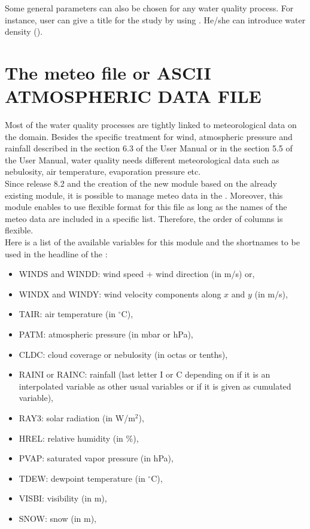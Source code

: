 Some general parameters can also be chosen for any water quality process.
For instance, user can give a title for the study by using .
He/she can introduce water density ().


\section{The meteo file or ASCII ATMOSPHERIC DATA FILE}
\label{subs:meteo:file}
Most of the water quality processes are tightly linked to
meteorological data on the domain.
Besides the specific treatment for wind, atmospheric pressure
and rainfall described in the section 6.3 of the  User Manual
or in the section 5.5 of the  User Manual,
water quality needs different meteorological data such as
nebulosity, air temperature, evaporation pressure etc.\\

Since release 8.2 and the creation of the new  module
based on the already existing  module, it is possible to
manage meteo data in the .
Moreover, this module enables to use flexible format for this file as long as
the names of the meteo data are included in a specific list.
Therefore, the order of columns is flexible.\\

Here is a list of the available variables for this module and the shortnames to
be used in the headline of the :
\begin{itemize}
\item WINDS and WINDD: wind speed + wind direction (in m/s) or,
\item WINDX and WINDY: wind velocity components along $x$ and $y$ (in m/s),
\item TAIR: air temperature (in $^{\circ}$C),
\item PATM: atmospheric pressure (in mbar or hPa),
\item CLDC: cloud coverage or nebulosity (in octas or tenths),
\item RAINI or RAINC: rainfall (last letter I or C depending on if it is
an interpolated variable as other usual variables
or if it is  given as cumulated variable),
\item RAY3: solar radiation (in W/m$^2$),
\item HREL: relative humidity (in \%),
\item PVAP: saturated vapor pressure (in hPa),
\item TDEW: dewpoint temperature (in $^{\circ}$C),
\item VISBI: visibility (in m),
\item SNOW: snow (in m),
\end{itemize}

